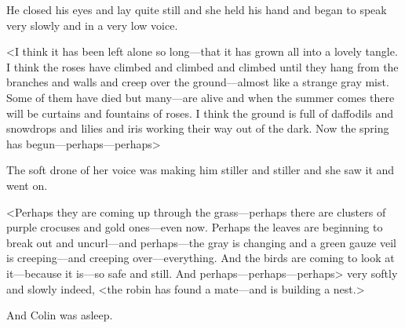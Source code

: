 He closed his eyes and lay quite still and she held his hand and began to speak very slowly and in a very low voice.

<I think it has been left alone so long—that it has grown all into a lovely tangle. I think the roses have climbed and climbed and climbed until they hang from the branches and walls and creep over the ground—almost like a strange gray mist. Some of them have died but many—are alive and when the summer comes there will be curtains and fountains of roses. I think the ground is full of daffodils and snowdrops and lilies and iris working their way out of the dark. Now the spring has begun—perhaps—perhaps\longdash>

The soft drone of her voice was making him stiller and stiller and she saw it and went on.

<Perhaps they are coming up through the grass—perhaps there are clusters of purple crocuses and gold ones—even now. Perhaps the leaves are beginning to break out and uncurl—and perhaps—the gray is changing and a green gauze veil is creeping—and creeping over—everything. And the birds are coming to look at it—because it is—so safe and still. And perhaps—perhaps—perhaps\longdash> very softly and slowly indeed, <the robin has found a mate—and is building a nest.>

And Colin was asleep.